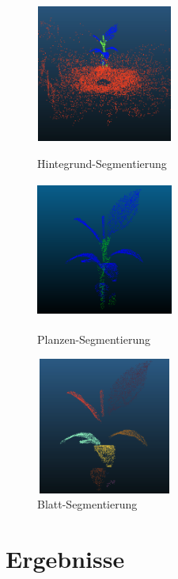 \documentclass[12pt,titlepage, twoside]{article}
\begin{document}
\begin{figure}
    \centering
    \begin{minipage}{0.3\textwidth}
        \centering
        \includegraphics[height=4.5cm,width=4.5cm]{./Images/PipelineBackgroundSegmentationStriped.png}
        \caption{Hintegrund-Segmentierung}
        \label{fig:PiplineBackgroundSegmentation}
    \end{minipage}\hfill
    \begin{minipage}{0.3\textwidth}
        \centering
        \includegraphics[height=4.5cm,width=4.5cm]{./Images/PipelinePlantSegmentation.png}
        \caption{Planzen-Segmentierung}
        \label{fig:PipelinePlantSegmentation}
    \end{minipage}\hfill
    \begin{minipage}{0.3\textwidth}
        \centering
        \includegraphics[height=4.5cm,width=4.5cm]{./Images/PipelineLeaveSegmentationStriped.png}
        \caption{Blatt-Segmentierung}
        \label{fig:PipelineLeaveSegmentation}
    \end{minipage}
\end{figure}

\newpage
\section{Ergebnisse}
\label{sec:ergebnisse}
%
\end{document}

